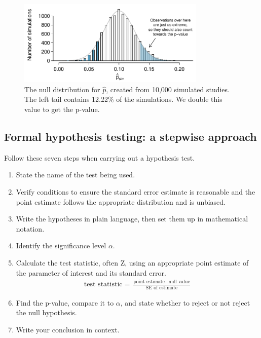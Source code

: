 \begin{figure}[ht]
\centering
\includegraphics[width=0.8\textwidth]{ch_inference_foundations/figures/MedicalConsultant/MedConsNullSim}
\caption{The null distribution for $\hat{p}$, created from 10,000 simulated studies. The left tail contains 12.22\% of the simulations. We double this value to get the p-value.}
\label{MedConsNullSim}
\end{figure}

\subsection{Formal hypothesis testing: a stepwise approach}

\begin{termBox}{
Follow these seven steps when carrying out a hypothesis test. 
\begin{enumerate}
\setlength{\itemsep}{0mm}
\item State the name of the test being used.
\item Verify conditions to ensure the standard error estimate is reasonable and the point estimate follows the appropriate distribution and is unbiased.
\item Write the hypotheses in plain language, then set them up in mathematical notation.
\item Identify the significance level $\alpha$.
\item Calculate the test statistic, often Z, using an appropriate point estimate of the parameter of interest and its standard error.\vspace{-1.5mm}
\begin{align*}
\text{test statistic} = \frac{\text{point estimate} - \text{null value}}{\text{SE of estimate}}
\end{align*}
\item Find the p-value, compare it to $\alpha$, and state whether to reject or not reject the null hypothesis.
\item Write your conclusion in context.
\end{enumerate}}
\end{termBox}

